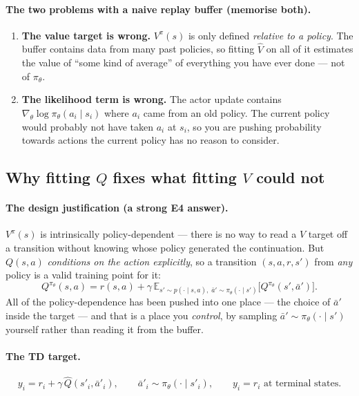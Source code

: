 \documentclass[11pt,a4paper]{article}
\begin{document}
\paragraph{The two problems with a naive replay buffer (memorise both).}
\begin{enumerate}[label=(\roman*)]
\item \textbf{The value target is wrong.} $V^\pi(s)$ is only defined
\emph{relative to a policy}. The buffer contains data from many past policies,
so fitting $\hat V$ on all of it estimates the value of ``some kind of
average'' of everything you have ever done --- not of $\pi_\theta$.
\item \textbf{The likelihood term is wrong.} The actor update contains
$\nabla_\theta\log\pi_\theta(a_i\mid s_i)$ where $a_i$ came from an old
policy. The current policy would probably not have taken $a_i$ at $s_i$, so
you are pushing probability towards actions the current policy has no reason
to consider.
\end{enumerate}

\subsection{Why fitting $Q$ fixes what fitting $V$ could not}

\paragraph{The design justification (a strong E4 answer).} $V^\pi(s)$ is
intrinsically policy-dependent --- there is no way to read a $V$ target off a
transition without knowing whose policy generated the continuation. But
$Q(s,a)$ \emph{conditions on the action explicitly}, so a transition
$(s,a,r,s')$ from \emph{any} policy is a valid training point for it:
\[
Q^{\pi_\theta}(s,a)=r(s,a)+\gamma\,\mathbb E_{s'\sim p(\cdot\mid s,a),\;\bar a'\sim\pi_\theta(\cdot\mid s')}\bigl[Q^{\pi_\theta}(s',\bar a')\bigr].
\]
All of the policy-dependence has been pushed into one place --- the choice of
$\bar a'$ inside the target --- and that is a place you \emph{control}, by
sampling $\bar a'\sim\pi_\theta(\cdot\mid s')$ yourself rather than reading it
from the buffer.

\paragraph{The TD target.}
\[
y_i = r_i + \gamma\,\hat Q(s'_i,\bar a'_i),\qquad \bar a'_i\sim\pi_\theta(\cdot\mid s'_i),
\qquad y_i=r_i \text{ at terminal states.}
\]
\end{document}
